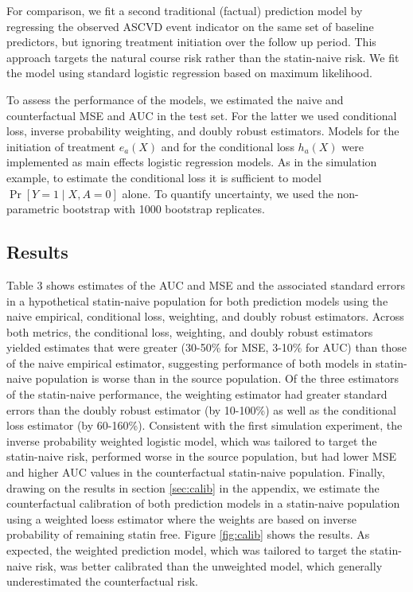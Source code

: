 For comparison, we fit a second traditional (factual) prediction model by regressing the observed ASCVD event indicator on the same set of baseline predictors, but ignoring treatment initiation over the follow up period. This approach targets the natural course risk rather than the statin-naive risk. We fit the model using standard logistic regression based on maximum likelihood.

To assess the performance of the models, we estimated the naive and counterfactual MSE and AUC in the test set. For the latter we used conditional loss, inverse probability weighting, and doubly robust estimators. Models for the initiation of treatment $e_a(X)$ and for the conditional loss $h_a(X)$ were implemented as main effects logistic regression models. As in the simulation example, to estimate the conditional loss it is sufficient to model $\operatorname{Pr}[Y=1 \mid X, A=0]$ alone. To quantify uncertainty, we used the non-parametric bootstrap with 1000 bootstrap replicates.

\subsection{Results}

Table 3 shows estimates of the AUC and MSE and the associated standard errors in a hypothetical statin-naive population for both prediction models using the naive empirical, conditional loss, weighting, and doubly robust estimators. Across both metrics, the conditional loss, weighting, and doubly robust estimators yielded estimates that were greater (30-50\% for MSE, 3-10\% for AUC) than those of the naive empirical estimator, suggesting performance of both models in statin-naive population is worse than in the source population. Of the three estimators of the statin-naive performance, the weighting estimator had greater standard errors than the doubly robust estimator (by 10-100\%) as well as the conditional loss estimator (by 60-160\%). Consistent with the first simulation experiment, the inverse probability weighted logistic model, which was tailored to target the statin-naive risk, performed worse in the source population, but had lower MSE and higher AUC values in the counterfactual statin-naive population. Finally, drawing on the results in section \ref{sec:calib} in the appendix, we estimate the counterfactual calibration of both prediction models in a statin-naive population using a weighted loess estimator where the weights are based on inverse probability of remaining statin free. Figure \ref{fig:calib} shows the results. As expected, the weighted prediction model, which was tailored to target the statin-naive risk, was better calibrated than the unweighted model, which generally underestimated the counterfactual risk.

